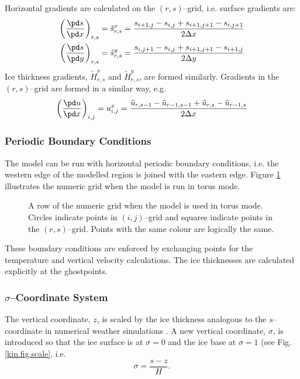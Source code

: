 Horizontal gradients are calculated on the $(r,s)$--grid, i.e. surface gradients are:
\begin{subequations}
\begin{align}
  \left(\frac{\pd s}{\pd x}\right)_{r,s}=\tilde{s}^x_{r,s}&=\frac{s_{i+1,j}-s_{i,j}+s_{i+1,j+1}-s_{i,j+1}}{2\Delta x}\\
  \left(\frac{\pd s}{\pd y}\right)_{r,s}=\tilde{s}^y_{r,s}&=\frac{s_{i,j+1}-s_{i,j}+s_{i+1,j+1}-s_{i+1,j}}{2\Delta y}
\end{align}  
\end{subequations}
Ice thickness gradients, $\tilde{H}^x_{r,s}$ and $\tilde{H}^y_{r,s}$, are formed similarly. Gradients in the $(r,s)$--grid are formed in a similar way, e.g. 
\begin{equation}
  \left(\frac{\pd u}{\pd x}\right)_{i,j}=u^x_{i,j}=\frac{\tilde{u}_{r,s-1}-\tilde{u}_{r-1,s-1}+\tilde{u}_{r,s}-\tilde{u}_{r-1,s}}{2\Delta x}
\end{equation}

\subsubsection{Periodic Boundary Conditions}
The model can be run with horizontal periodic boundary conditions, i.e. the western edge of the modelled region is joined with the eastern edge. Figure \ref{num.fig.grid_ew} illustrates the numeric grid when the model is run in torus mode.

\begin{figure}[htbp]
  \centering
  \caption{A row of the numeric grid when the model is used in torus mode. Circles indicate points in $(i,j)$--grid and squares indicate points in the $(r,s)$--grid. Points with the same colour are logically the same.}
  \label{num.fig.grid_ew}
\end{figure}

These boundary conditions are enforced by exchanging points for the temperature and vertical velocity calculations. The ice thicknesses are calculated explicitly at the ghostpoints.

\subsubsection{$\sigma$--Coordinate System}
The vertical coordinate, $z$, is scaled by the ice thickness analogous to the $s$--coordinate in numerical weather simulations \citep[e.g.][]{Holton1992}. A new vertical coordinate, $\sigma$, is introduced so that the ice surface is at $\sigma=0$ and the ice base at $\sigma=1$ (see Fig. \ref{kin.fig.scale}, i.e.
\begin{equation}
  \label{kin.eq.vertical_scale}
  \sigma=\frac{s-z}{H}.
\end{equation}

